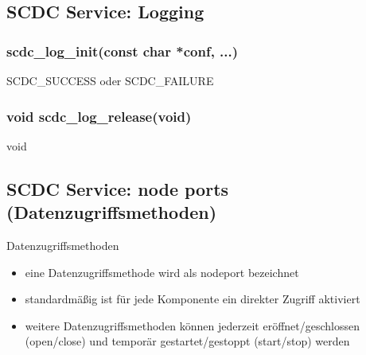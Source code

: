 \subsection{SCDC Service: Logging}
\subsubsection[scdcint\_t scdc\_log\_init(const char *conf, ...)]{ \scdcintt scdc\_log\_init(const char *conf, ...) }\label{scdc_log_init}
			{
			}
			{\scdcintt}{SCDC\_SUCCESS oder SCDC\_FAILURE}
			
\subsubsection[void scdc\_log\_release(void)]{ void scdc\_log\_release(void) }\label{scdc_log_release}
			{
			}
			{void}{}
			
\subsection{SCDC Service: node ports (Datenzugriffsmethoden)}
Datenzugriffsmethoden
\begin{itemize}
\item eine Datenzugriffsmethode wird als nodeport bezeichnet
\item standardmäßig ist für jede Komponente ein direkter Zugriff aktiviert
\item weitere Datenzugriffsmethoden können jederzeit eröffnet/geschlossen (open/close) und temporär gestartet/gestoppt (start/stop) werden
\end{itemize}


